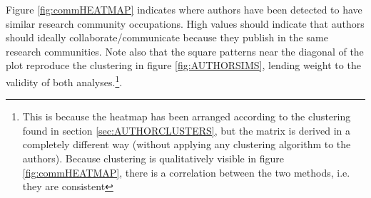 Figure \ref{fig:commHEATMAP} indicates where authors have been detected to have similar research community occupations. High values should indicate that authors should ideally collaborate/communicate because they publish in the same research communities. Note also that the square patterns near the diagonal of the plot reproduce the clustering in figure \ref{fig:AUTHORSIMS}, lending weight to the validity of both analyses.\footnote{This is because the heatmap has been arranged according to the clustering found in section \ref{sec:AUTHORCLUSTERS}, but the matrix is derived in a completely different way (without applying any  clustering algorithm to the authors). Because clustering is qualitatively visible in figure \ref{fig:commHEATMAP}, there is a correlation between the two methods, i.e. they are consistent}.